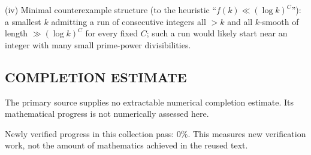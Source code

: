 (iv) Minimal counterexample structure (to the heuristic “$f(k)\ll (\log k)^C$”): a smallest $k$ admitting a run of consecutive integers all $>k$ and all $k$-smooth of length $\gg (\log k)^C$ for every fixed $C$; such a run would likely start near an integer with many small prime-power divisibilities.




\subsection*{COMPLETION ESTIMATE}
The primary source supplies no extractable numerical completion estimate. Its mathematical progress is not numerically assessed here.

Newly verified progress in this collection pass: $0\%$. This measures new verification work, not the amount of mathematics achieved in the reused text.
